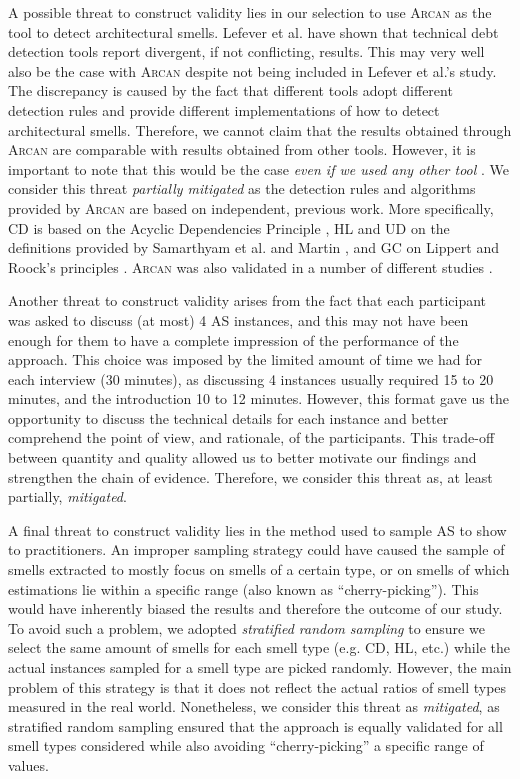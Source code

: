 A possible threat to construct validity lies in our selection to use \textsc{Arcan} as the tool to detect architectural smells. Lefever et al. \cite{Lefever2021} have shown that technical debt detection tools report divergent, if not conflicting, results.
This may very well also be the case with \textsc{Arcan} despite not being included in Lefever et al.'s study.
The discrepancy is caused by the fact that different tools adopt different detection rules and provide different implementations of how to detect architectural smells.
Therefore, we cannot claim that the results obtained through \textsc{Arcan} are comparable with results obtained from other tools.
However, it is important to note that this would be the case \emph{even if we used any other tool} \cite{Lefever2021}.
We consider this threat \emph{partially mitigated} as the detection rules and algorithms provided by \textsc{Arcan} are based on independent, previous work.
More specifically, CD is based on the Acyclic Dependencies Principle \cite{Martin2018,Lippert2006}, HL and UD on the definitions provided by Samarthyam et al. \cite{Samarthyam2016} and Martin \cite{Martin2018}, and GC on Lippert and Roock's principles \cite{Lippert2006}.
\textsc{Arcan} was also validated in a number of different studies \cite{Martini2018,Arcelli2020,Arcelli2017}.

Another threat to construct validity arises from the fact that each participant was asked to discuss (at most) 4 AS instances, and this may not have been enough for them to have a complete impression of the performance of the approach.
This choice was imposed by the limited amount of time we had for each interview (30 minutes), as discussing 4 instances usually required 15 to 20 minutes, and the introduction 10 to 12 minutes.
However, this format gave us the opportunity to discuss the technical details for each instance and better comprehend the point of view, and rationale, of the participants.
This trade-off between quantity and quality allowed us to better motivate our findings and strengthen the chain of evidence.
Therefore, we consider this threat as, at least partially, \emph{mitigated}.

A final threat to construct validity lies in the method used to sample AS to show to practitioners.
An improper sampling strategy could have caused the sample of smells extracted to mostly focus on smells of a certain type, or on smells of which estimations lie within a specific range (also known as ``cherry-picking'').
This would have inherently biased the results and therefore the outcome of our study.
To avoid such a problem, we adopted \emph{stratified random sampling} to ensure we select the same amount of smells for each smell type (e.g. CD, HL, etc.) while the actual instances sampled for a smell type are picked randomly. 
However, the main problem of this strategy is that it does not reflect the actual ratios of smell types measured in the real world.
Nonetheless, we consider this threat as \emph{mitigated}, as stratified random sampling ensured that the approach is equally validated for all smell types considered while also avoiding ``cherry-picking'' a specific range of values. 


